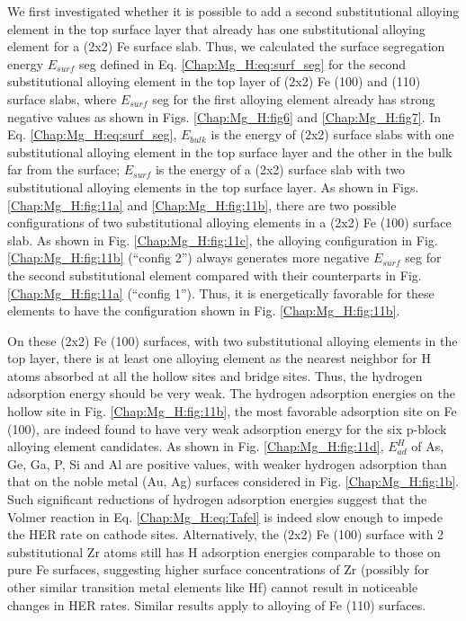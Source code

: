 We first investigated whether it is possible to add a second substitutional alloying element in the top surface layer that already has one substitutional alloying element for a (2x2) Fe surface slab. Thus, we calculated the surface segregation energy $E_{surf}$ seg defined in Eq. \ref{Chap:Mg_H:eq:surf_seg} for the second substitutional alloying element in the top layer of (2x2) Fe (100) and (110) surface slabs, where $E_{surf}$ seg for the first alloying element already has strong negative values as shown in Figs. \ref{Chap:Mg_H:fig6} and \ref{Chap:Mg_H:fig7}. In Eq. \ref{Chap:Mg_H:eq:surf_seg}, $E_{bulk}$ is the energy of (2x2) surface slabs with one substitutional alloying element in the top surface layer and the other in the bulk far from the surface; $E_{surf}$ is the energy of a (2x2) surface slab with two substitutional alloying elements in the top surface layer. As shown in Figs. \ref{Chap:Mg_H:fig:11a} and \ref{Chap:Mg_H:fig:11b}, there are two possible configurations of two substitutional alloying elements in a (2x2) Fe (100) surface slab. As shown in Fig. \ref{Chap:Mg_H:fig:11c}, the alloying configuration in Fig. \ref{Chap:Mg_H:fig:11b} (“config 2”) always generates more negative $E_{surf}$ seg for the second substitutional element compared with their counterparts in Fig. \ref{Chap:Mg_H:fig:11a} (“config 1”). Thus, it is energetically favorable for these elements to have the configuration shown in Fig. \ref{Chap:Mg_H:fig:11b}. 

On these (2x2) Fe (100) surfaces, with two substitutional alloying elements in the top layer, there is at least one alloying element as the nearest neighbor for H atoms absorbed at all the hollow sites and bridge sites. Thus, the hydrogen adsorption energy should be very weak. The hydrogen adsorption energies on the hollow site in Fig. \ref{Chap:Mg_H:fig:11b}, the most favorable adsorption site on Fe (100), are indeed found to have very weak adsorption energy for the six p-block alloying element candidates. As shown in Fig. \ref{Chap:Mg_H:fig:11d}, $E_{ad}^H$ of As, Ge, Ga, P, Si and Al are positive values, with weaker hydrogen adsorption than that on the noble metal (Au, Ag) surfaces considered in Fig. \ref{Chap:Mg_H:fig:1b}. Such significant reductions of hydrogen adsorption energies suggest that the Volmer reaction in Eq. \ref{Chap:Mg_H:eq:Tafel} is indeed slow enough to impede the \ac{HER} rate on cathode sites. Alternatively, the (2x2) Fe (100) surface with 2 substitutional Zr atoms still has H adsorption energies comparable to those on pure Fe surfaces, suggesting higher surface concentrations of Zr (possibly for other similar transition metal elements like Hf) cannot result in noticeable changes in \ac{HER} rates. Similar results apply to alloying of Fe (110) surfaces.

